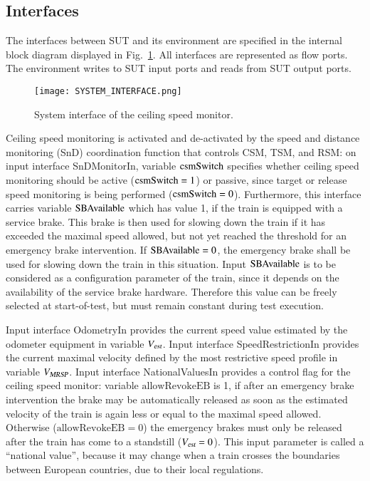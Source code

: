 \subsection{Interfaces}

The interfaces between SUT and its environment are specified in the
internal block diagram displayed in Fig.~\ref{fig:sysif}. All
interfaces are represented as flow ports. The environment writes to
SUT input ports and reads from SUT output ports.

 \begin{figure}
\texttt{[image: SYSTEM\_INTERFACE.png]}
\caption{System interface of the ceiling speed monitor.}
 \label{fig:sysif}
 \end{figure}
 
Ceiling speed monitoring is activated and de-activated by the speed and distance monitoring (SnD) coordination function that controls CSM, TSM, and RSM: on input interface {\sf SnDMonitorIn}, variable  $\text{csmSwitch}$   specifies whether ceiling speed monitoring should be active ($\text{csmSwitch}=1$) or passive, since target  or release speed monitoring is being performed ($\text{csmSwitch} = 0$). Furthermore, this interface carries variable $\text{SBAvailable}$ which has value 1, if the train is equipped with a service brake. This brake is then used for slowing down the train if it has exceeded the maximal speed allowed, but not yet reached the threshold for an emergency brake intervention. If $\text{SBAvailable} = 0$, the emergency brake shall be used for slowing down the train in this situation. Input $\text{SBAvailable}$ is to be considered as  a configuration parameter of the train, since it depends on the availability of the service brake hardware. Therefore this value can be freely selected at start-of-test, but must remain constant during test execution.



Input interface {\sf OdometryIn} provides the current speed value
estimated by the odometer equipment in variable ${V_{\text{\sl est}}}$. Input
interface {\sf SpeedRestrictionIn} provides the current maximal
velocity defined by the most restrictive speed profile in variable
${V_{\text{\sl MRSP}}}$. Input interface {\sf NationalValuesIn} provides a control
flag for the ceiling speed monitor: variable $\text{allowRevokeEB}$ is
1, if after an emergency brake intervention the brake may be
automatically released as soon as the estimated velocity of the train
is again less or equal to the maximal speed allowed. Otherwise
($\text{allowRevokeEB} = 0$) the emergency brakes must only be
released after the train has come to a standstill (${V_{\text{\sl est}}} = 0$).
This input parameter is called a ``national value'', because it may change when a
train crosses the boundaries between European countries, due to their local regulations.


